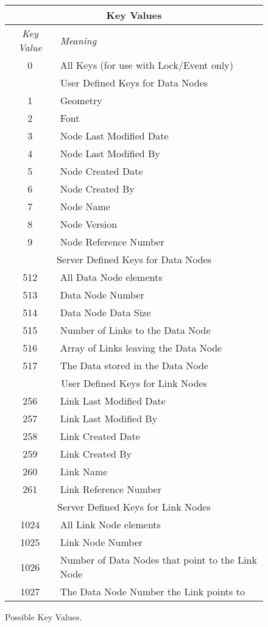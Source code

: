 \begin{figure}[htpb]
  \begin{center}
    \begin{tabular} {|c|l|} \hline
      \multicolumn{2}{|c|}{{\bf Key Values}} \\ \hline {\em Key
      Value} & {\em Meaning}\\  \hline 
      0 & All Keys (for use with Lock/Event only) \\ \hline \hline
      \multicolumn{2}{|c|}{{User Defined Keys for Data Nodes}} \\ \hline
      1 & Geometry  \\ \hline
      2 & Font  \\ \hline
      3 & Node Last Modified Date  \\ \hline
      4 & Node Last Modified By  \\ \hline
      5 & Node Created Date  \\ \hline
      6 & Node Created By  \\ \hline
      7 & Node Name  \\ \hline
      8 & Node Version  \\ \hline
      9 & Node Reference Number  \\ \hline \hline
      \multicolumn{2}{|c|}{{Server Defined Keys for Data Nodes}} \\ \hline
      512 & All Data Node elements  \\ \hline
      513 & Data Node Number  \\ \hline
      514 & Data Node Data Size  \\ \hline
      515 & Number of Links to the Data Node  \\ \hline
      516 & Array of Links leaving the Data Node \\ \hline
      517 & The Data stored in the Data Node \\ \hline \hline
      \multicolumn{2}{|c|}{{User Defined Keys for Link Nodes}} \\ \hline
      256 & Link Last Modified Date  \\ \hline
      257 & Link Last Modified By  \\ \hline
      258 & Link Created Date  \\ \hline
      259 & Link Created By  \\ \hline
      260 & Link Name  \\ \hline
      261 & Link Reference Number  \\ \hline \hline
      \multicolumn{2}{|c|}{{Server Defined Keys for Link Nodes}} \\ \hline
      1024 & All Link Node elements \\ \hline
      1025 & Link Node Number \\ \hline
      1026 & Number of Data Nodes that point to the Link Node \\ \hline
      1027 & The Data Node Number the Link points to \\ \hline
    \end{tabular}
  \end{center}
  \caption{\label{keyVal}Possible Key Values. }
\end{figure}
\normalsize


